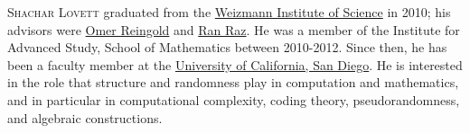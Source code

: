 \documentclass{toc}
\begin{document}
\begin{tocaboutauthors}
\begin{tocabout}[lovett]
\textsc{Shachar Lovett} 
graduated from the
\href{https://www.weizmann.ac.il/}{Weizmann Institute of Science} in 2010;
his advisors were
\href{https://omereingold.wordpress.com/}{Omer Reingold} and
\href{https://www.cs.princeton.edu/people/profile/ranr}{Ran Raz}.
He was a member of the Institute for Advanced Study,
School of Mathematics between 2010-2012. Since then, he has been
a faculty member at the
\href{http://www.ucsd.edu}{University of California, San Diego}. He is
interested in the role that structure and randomness play in
computation and mathematics, and in particular in computational
complexity, coding theory,
%
pseudorandomness,     %
and algebraic constructions.
\end{tocabout}
\end{tocaboutauthors}
\end{document}
